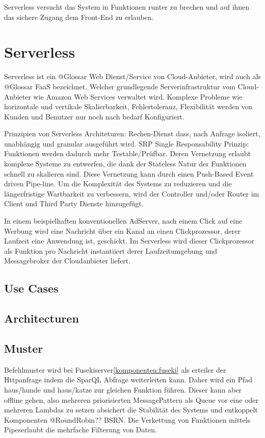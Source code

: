 \documentclass[
12pt,
english,
ngerman,
headsepline,
twoside,
openright,
numbers=noenddot,version=first
]{scrreprt}
\begin{document}
Serverless versucht das System in Funktionen runter zu brechen und auf ihnen das sichere Zugang dem Front-End zu erlauben.

\section{Serverless}
\label{sec:serverless}

Serverless ist ein @Glossar Web Dienst/Service von Cloud-Anbieter, wird auch als @Glossar FaaS bezeichnet. Welcher grundlegende Serverinfrastruktur vom Cloud-Anbieter wie Amazon Web Services verwaltet wird. Komplexe Probleme wie horizontale und vertikale Skalierbarkeit, Fehlertoleranz, Flexibilität werden von Kunden und Benutzer nur noch nach bedarf Konfiguriert.


Prinzipien\label{par:serverless-principles} von Serverless Architeturen: \cite{sbarski2017serverless}
Rechen-Dienst dass, nach Anfrage isoliert, unabhängig und granular ausgeführt wird.
SRP Single Responsability Prinzip: Funktionen werden dadurch mehr Testable/Prüfbar. Deren Vernetzung erlaubt komplexe Systeme zu entwerfen, die dank der Stateless Natur der Funktionen schnell zu skalieren sind.
Diese Vernetzung kann durch einen Push-Based Event driven Pipe-line.
Um die Komplexität des Systems zu reduzieren und die längerfristige Wartbarkeit zu verbessern, wird der Controller und/oder Router im Client und Third Party Dienste hinzugefügt.

In einem beispielhaften konventionellen AdServer, nach einem Click auf eine Werbung wird eine Nachricht über ein Kanal an einen Clickprozessor, derer Laufzeit eine Anwendung ist, geschickt. Im Serverless wird dieser Clickprozessor als Funktion pro Nachricht instantiiert derer Laufzeitumgebung und Messagebroker der Cloudanbieter liefert.

\subsection{Use Cases}

\subsection{Architecturen}

\subsection{Muster}

Befehlmuster wird bei Fusekiserver\ref{komponenten:fuseki} als erteiler der Httpanfrage indem die SparQL Abfrage weiterleiten kann. Daher wird ein Pfad haus/hunde und haus/katze zur gleichen Funktion führen.
Dieser kann aber offline gehen, also mehreren priorisierten MessagePattern als Queue vor eine oder mehreren Lambdas zu setzen absichert die Stabilität des Systems und entkoppelt Komponenten @RoundRobin?? BSRN.
Die Verkettung von Funktionen mittels \glqq Pipes\grqq erlaubt die mehrfache Filterung von Daten.
\end{document}
